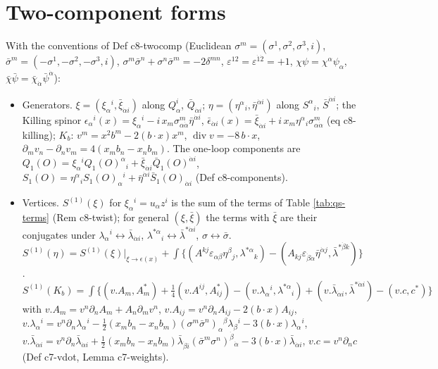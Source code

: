 \section{Two-component forms}
\label{sec:qs-twocomp}

\begin{remark}
\label{rem:qs-twocomp}
With the conventions of Def c8-twocomp (Euclidean $\sigma^m=(\sigma^1,\sigma^2,\sigma^3,i)$, $\bar\sigma^m=(-\sigma^1,-\sigma^2,-\sigma^3,i)$, $\sigma^m\bar\sigma^n+\sigma^n\bar\sigma^m=-2\delta^{mn}$, $\varepsilon^{12}=\varepsilon^{\dot1\dot2}=+1$, $\chi\psi=\chi^\alpha\psi_\alpha$, $\bar\chi\bar\psi=\bar\chi_{\dot\alpha}\bar\psi^{\dot\alpha}$):
\begin{itemize}
\item Generators. $\xi=(\xi_\alpha{}^i,\bar\xi_{\dot\alpha i})$ along $Q^i_\alpha$, $\bar Q_{\dot\alpha i}$; $\eta=(\eta^\alpha{}_i,\bar\eta^{\dot\alpha i})$ along $S^\alpha{}_i$, $\bar S^{\dot\alpha i}$; the Killing spinor $\epsilon_\alpha{}^i(x)=\xi_\alpha{}^i-i\,x_m\sigma^m_{\alpha\dot\alpha}\bar\eta^{\dot\alpha i}$, $\bar\epsilon_{\dot\alpha i}(x)=\bar\xi_{\dot\alpha i}+i\,x_m\eta^\alpha{}_i\sigma^m_{\alpha\dot\alpha}$ (eq c8-killing); $K_b$: $v^m=x^2b^m-2(b\cdot x)x^m$, $\operatorname{div}v=-8\,b\cdot x$, $\partial_mv_n-\partial_nv_m=4(x_mb_n-x_nb_m)$. The one-loop components are $Q_1(O)=\xi_\alpha{}^iQ_1(O)^\alpha{}_i+\bar\xi_{\dot\alpha i}\bar Q_1(O)^{\dot\alpha i}$, $S_1(O)=\eta^\alpha{}_iS_1(O)_\alpha{}^i+\bar\eta^{\dot\alpha i}\bar S_1(O)_{\dot\alpha i}$ (Def c8-components).
\item Vertices. $S^{(1)}(\xi)$ for $\xi_\alpha{}^i=u_\alpha z^i$ is the sum of the terms of Table \ref{tab:qs-terms} (Rem c8-twist); for general $(\xi,\bar\xi)$ the terms with $\bar\xi$ are their conjugates under $\lambda_\alpha{}^i\leftrightarrow\bar\lambda_{\dot\alpha i}$, $\lambda^{*\alpha}{}_i\leftrightarrow\bar\lambda^{*\dot\alpha i}$, $\sigma\leftrightarrow\bar\sigma$. $S^{(1)}(\eta)=S^{(1)}(\xi)|_{\xi\to\epsilon(x)}+\int\big\{(A^{kj}\varepsilon_{\alpha\beta}\eta^\beta{}_j,\lambda^{*\alpha}{}_k)-(A_{kj}\varepsilon_{\dot\beta\dot\alpha}\bar\eta^{\dot\alpha j},\bar\lambda^{*\dot\beta k})\big\}$. $S^{(1)}(K_b)=\int\big\{(v.A_m,A^*_m)+\tfrac14(v.A^{ij},A^*_{ij})-(v.\lambda_\alpha{}^i,\lambda^{*\alpha}{}_i)+(v.\bar\lambda_{\dot\alpha i},\bar\lambda^{*\dot\alpha i})-(v.c,c^*)\big\}$ with $v.A_m=v^n\partial_nA_m+A_n\partial_mv^n$, $v.A_{ij}=v^n\partial_nA_{ij}-2(b\cdot x)A_{ij}$, $v.\lambda_\alpha{}^i=v^n\partial_n\lambda_\alpha{}^i-\tfrac12(x_mb_n-x_nb_m)(\sigma^m\bar\sigma^n)_\alpha{}^\beta\lambda_\beta{}^i-3(b\cdot x)\lambda_\alpha{}^i$, $v.\bar\lambda_{\dot\alpha i}=v^n\partial_n\bar\lambda_{\dot\alpha i}+\tfrac12(x_mb_n-x_nb_m)\bar\lambda_{\dot\beta i}(\bar\sigma^m\sigma^n)^{\dot\beta}{}_{\dot\alpha}-3(b\cdot x)\bar\lambda_{\dot\alpha i}$, $v.c=v^n\partial_nc$ (Def c7-vdot, Lemma c7-weights).

\end{itemize}
\end{remark}
